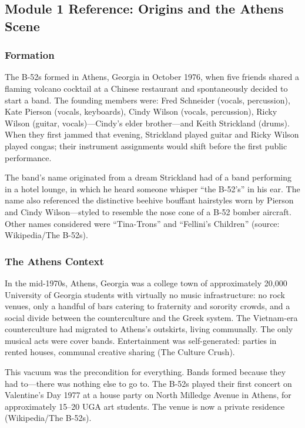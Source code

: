 \documentclass[11pt,letterpaper]{article}
\begin{document}
\subsection{Module 1 Reference: Origins and the Athens Scene}

\subsubsection{Formation}

The B-52s formed in Athens, Georgia in October 1976, when five friends shared a flaming volcano cocktail at a Chinese restaurant and spontaneously decided to start a band. The founding members were: Fred Schneider (vocals, percussion), Kate Pierson (vocals, keyboards), Cindy Wilson (vocals, percussion), Ricky Wilson (guitar, vocals)---Cindy's elder brother---and Keith Strickland (drums). When they first jammed that evening, Strickland played guitar and Ricky Wilson played congas; their instrument assignments would shift before the first public performance.

The band's name originated from a dream Strickland had of a band performing in a hotel lounge, in which he heard someone whisper ``the B-52's'' in his ear. The name also referenced the distinctive beehive bouffant hairstyles worn by Pierson and Cindy Wilson---styled to resemble the nose cone of a B-52 bomber aircraft. Other names considered were ``Tina-Trons'' and ``Fellini's Children'' (source: Wikipedia/The B-52s).

\subsubsection{The Athens Context}

In the mid-1970s, Athens, Georgia was a college town of approximately 20,000 University of Georgia students with virtually no music infrastructure: no rock venues, only a handful of bars catering to fraternity and sorority crowds, and a social divide between the counterculture and the Greek system. The Vietnam-era counterculture had migrated to Athens's outskirts, living communally. The only musical acts were cover bands. Entertainment was self-generated: parties in rented houses, communal creative sharing (The Culture Crush).

This vacuum was the precondition for everything. Bands formed because they had to---there was nothing else to go to. The B-52s played their first concert on Valentine's Day 1977 at a house party on North Milledge Avenue in Athens, for approximately 15--20 UGA art students. The venue is now a private residence (Wikipedia/The B-52s).
\end{document}
